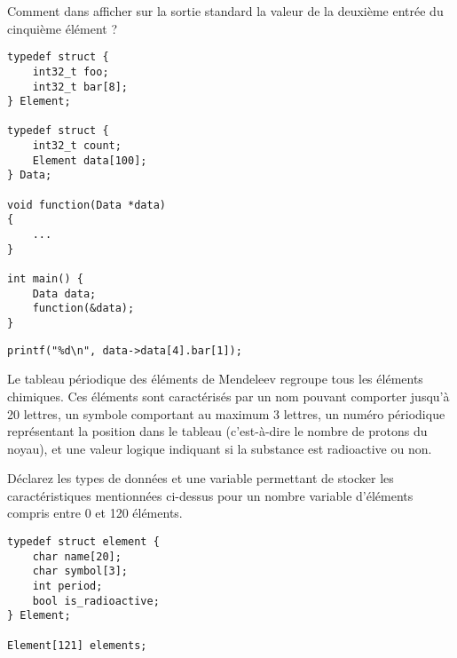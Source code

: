 \documentclass[french,a4paper,addpoints,11pt]{exam}
\begin{document}
\begin{questions}
\question Comment dans  afficher sur la sortie standard la valeur de la deuxième entrée  du cinquième élément ?

\begin{multicols}{2}
\begin{lstlisting}
typedef struct {
    int32_t foo;
    int32_t bar[8];
} Element;

typedef struct {
    int32_t count;
    Element data[100];
} Data;

void function(Data *data)
{
    ...
}

int main() {
    Data data;
    function(&data);
}
\end{lstlisting}
\end{multicols}

\ifprintanswers
\begin{solution}
\begin{lstlisting}
printf("%d\n", data->data[4].bar[1]);
\end{lstlisting}
\end{solution}
\fi
\question
Le tableau périodique des éléments de Mendeleev regroupe tous les éléments chimiques. Ces éléments sont caractérisés par un nom pouvant comporter jusqu'à 20 lettres, un symbole comportant au maximum 3 lettres, un numéro périodique représentant la position dans le tableau (c'est-à-dire le nombre de protons du noyau), et une valeur logique indiquant si la substance est radioactive ou non.

Déclarez les types de données et une variable permettant de stocker les caractéristiques mentionnées ci-dessus pour un nombre variable d'éléments compris entre 0 et 120 éléments.

\ifprintanswers
\begin{solution}
\begin{lstlisting}
typedef struct element {
    char name[20];
    char symbol[3];
    int period;
    bool is_radioactive;
} Element;

Element[121] elements;
\end{lstlisting}
\end{solution}
\fi
\end{questions}
\end{document}
